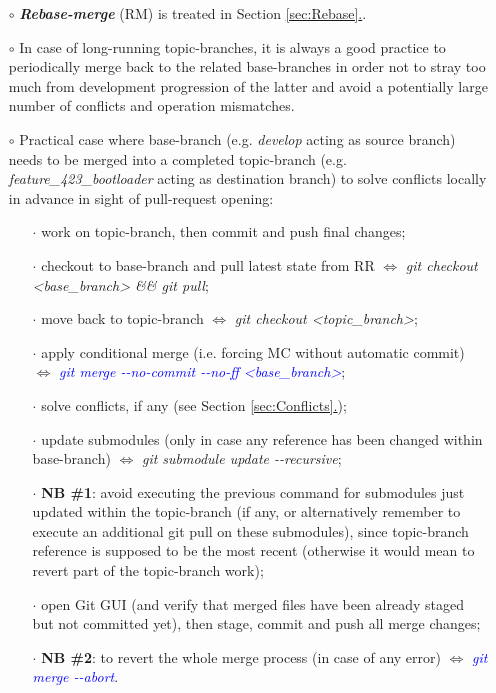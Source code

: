 \documentclass[a4paper,portrait,10pt]{article}   %
\newcommand{\mydiv}{$\Leftrightarrow$ }   %
\newcommand{\mycmd}[1]{\textcolor{blue}{\textit{#1}}}   %
\newcommand{\myvspace}{\vspace{4mm}}   %
\newcommand{\mysecref}[1]{\hyperref[#1]{\ref{#1}.}}   %
\newcommand{\mytzdivcolor}{black!5!orange}   %
\begin{document}
\begin{itemize}
\begin{figure}[h!]
\end{figure}

\item[$\circ$] \textbf{\textit{Rebase-merge}} (RM) is treated in Section \mysecref{sec:Rebase}.
\myvspace

\item[$\circ$] In case of long-running topic-branches, it is always a good practice to periodically merge back to the related base-branches in order not to stray too much from development progression of the latter and avoid a potentially large number of conflicts and operation mismatches.
\myvspace

\item[$\circ$] Practical case where base-branch (e.g. \textit{develop} acting as source branch) needs to be merged into a completed topic-branch (e.g. \textit{feature\_423\_bootloader} acting as destination branch) to solve conflicts locally in advance in sight of pull-request opening:
\begin{itemize}
  \item[$\cdot$] work on topic-branch, then commit and push final changes;
  \item[$\cdot$] checkout to base-branch and pull latest state from RR \mydiv \textit{git checkout <base\_branch> \&\& git pull};
  \item[$\cdot$] move back to topic-branch \mydiv \textit{git checkout <topic\_branch>};
  \item[$\cdot$] apply conditional merge (i.e. forcing MC without automatic commit) \mydiv \mycmd{git merge -{}-no-commit -{}-no-ff <base\_branch>};
  \item[$\cdot$] solve conflicts, if any (see Section \mysecref{sec:Conflicts});
  \item[$\cdot$] update submodules (only in case any reference has been changed within base-branch) \mydiv \textit{git submodule update -{}-recursive};
  \item[$\cdot$] \textbf{NB \#1}: avoid executing the previous command for submodules just updated within the topic-branch (if any, or alternatively remember to execute an additional git pull on these submodules), since topic-branch reference is supposed to be the most recent (otherwise it would mean to revert part of the topic-branch work);
  \item[$\cdot$] open Git GUI (and verify that merged files have been already staged but not committed yet), then stage, commit and push all merge changes;
  \item[$\cdot$] \textbf{NB \#2}: to revert the whole merge process (in case of any error) \mydiv \mycmd{git merge -{}-abort}.
\end{itemize}
\end{itemize}
\myvspace
\end{document}
